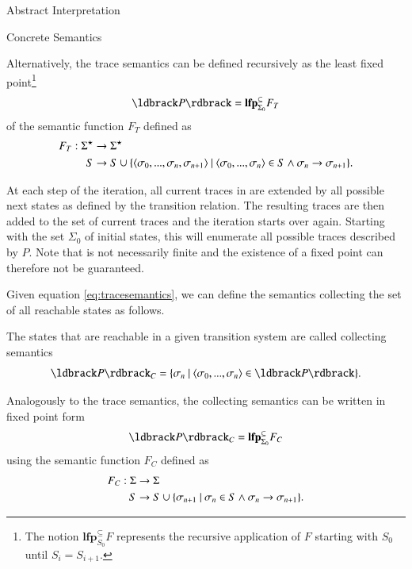 \begin{chapter}{Abstract Interpretation}
\begin{section}{Concrete Semantics}
		\begin{definition}
			\label{definition:TraceSemanticsFixedPoint}
			Alternatively, the trace semantics can be defined recursively as the least fixed point\footnote{The notion $\textbf{lfp}_{S_0}^{\subseteq} F$ represents the recursive application of $F$ starting with $S_0$ until $S_i = S_{i+1}$.}
			\begin{equation}
				\concrete{P} = \textbf{lfp}_{\Sigma_0}^{\subseteq}F_T
			\end{equation}
			of the semantic function $F_T$ defined as
			\begin{align}
				F_T: \Sigma^\star &\to \Sigma^\star\\
				S &\to S \cup \{ \langle \sigma_0, ..., \sigma_n, \sigma_{n+1} \rangle \ | \ \langle \sigma_0, ..., \sigma_n \rangle \in S \land \sigma_n \to \sigma_{n+1} \}. \notag
			\end{align}
		\end{definition}

		At each step of the iteration, all current traces in  are extended by all possible next states as defined by the transition relation. The resulting traces are then added to the set of current traces and the iteration starts over again. Starting with the set $\Sigma_0$ of initial states, this will enumerate all possible traces described by $P$. Note that  is not necessarily finite and the existence of a fixed point can therefore not be guaranteed.

		Given equation \ref{eq:tracesemantics}, we can define the semantics collecting the set of all reachable states as follows.

		\begin{definition}
			\label{definition:collectingsemantics}
			The states that are reachable in a given transition system are called collecting semantics
			\begin{equation}
				\collecting{P} = \{\sigma_n \ | \ \langle \sigma_0, ..., \sigma_n \rangle \in \concrete{P} \}.
			\end{equation}
		\end{definition}

		\begin{definition}
			\label{definition:CollectingSemanticsFixedPoint}
			Analogously to the trace semantics, the collecting semantics can be written in fixed point form
			\begin{equation}
				\collecting{P} = \textbf{lfp}_{\Sigma_0}^{\subseteq}F_C
			\end{equation}
			using the semantic function $F_C$ defined as
			\begin{align}
				F_C: \Sigma &\to \Sigma\\
				S &\to S \cup \{ \sigma_{n+1} \ | \ \sigma_n \in S \land \sigma_n \to \sigma_{n+1} \}. \notag
			\end{align}
		\end{definition}


\end{section}
\end{chapter}

